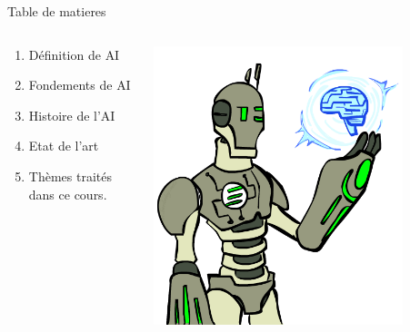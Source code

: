 \documentclass{beamer}
\begin{document}
\begin{frame}{Table de matieres}
  \begin{columns}
    \begin{column}{0.5\textwidth}
      {\scriptsize
      \begin{enumerate}
        \item Définition de \ac{AI}\\

        \item Fondements de \ac{AI}\\

        \item Histoire de l'\ac{AI}\\

        \item Etat de l'art\\

        \item Thèmes traités dans ce cours.
      \end{enumerate}
    }
    \end{column}
    \begin{column}{0.5\textwidth}
    \centering
    \includegraphics[width=0.8\textwidth]{./images/robot_contents.png}
    \end{column}
  \end{columns}
\end{frame}

\end{document}
